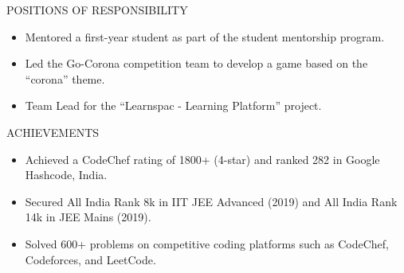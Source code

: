 \documentclass{resume}
\begin{document}
\begin{rSection}{POSITIONS OF RESPONSIBILITY}

\begin{itemize}
    \itemsep-0.5em 
    \item Mentored a first-year student as part of the student mentorship program.
    \item Led the Go-Corona competition team to develop a game based on the “corona” theme.
    \item Team Lead for the “Learnspac - Learning Platform” project.
\end{itemize}

\end{rSection}


\begin{rSection}{ACHIEVEMENTS}

\begin{itemize}
    \itemsep-0.5em 
    \item Achieved a CodeChef rating of 1800+ (4-star) and ranked 282 in Google Hashcode, India.
    \item Secured All India Rank 8k in IIT JEE Advanced (2019) and All India Rank 14k in JEE Mains (2019).
    \item Solved 600+ problems on competitive coding platforms such as CodeChef, Codeforces, and LeetCode.
\end{itemize}

\end{rSection}

\end{document}
